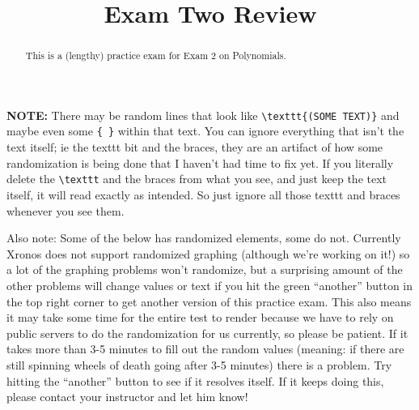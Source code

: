 \documentclass{ximera}
\title{Exam Two Review}
\begin{document}
\begin{abstract}
This is a (lengthy) practice exam for Exam 2 on Polynomials.
\end{abstract}
\maketitle


\shuffleChoicestrue
\shuffleQuestionstrue
{}

\textbf{NOTE:} There may be random lines that look like \verb|\texttt{(SOME TEXT)}| and maybe even some \verb|{ }| within that text. You can ignore everything that isn't the text itself; ie the texttt bit and the braces, they are an artifact of how some randomization is being done that I haven't had time to fix yet. If you literally delete the \verb|\texttt| and the braces from what you see, and just keep the text itself, it will read exactly as intended. So just ignore all those texttt and braces whenever you see them.

Also note: Some of the below has randomized elements, some do not. Currently Xronos does not support randomized graphing (although we're working on it!) so a lot of the graphing problems won't randomize, but a surprising amount of the other problems will change values or text if you hit the green ``another'' button in the top right corner to get another version of this practice exam. This also means it may take some time for the entire test to render because we have to rely on public servers to do the randomization for us currently, so please be patient. If it takes more than 3-5 minutes to fill out the random values (meaning: if there are still spinning wheels of death going after 3-5 minutes) there is a problem. Try hitting the ``another'' button to see if it resolves itself. If it keeps doing this, please contact your instructor and let him know!



\end{document}
